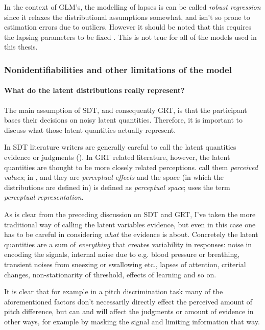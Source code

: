 \documentclass{article}\usepackage{knitr}
\begin{document}
In the context of GLM's, the modelling of lapses is can be called \textit{robust regression} \citep[p. 635]{kruschke2015} since it relaxes the distributional assumptions somewhat, and isn't so prone to estimation errors due to outliers. However it should be noted that this requires the lapsing parameters to be fixed \cite{skrondahl2004}. This is not true for all of the models used in this thesis.

\subsubsection{Nonidentifiabilities and other limitations of the model}

\paragraph{What do the latent distributions really represent?}

The main assumption of SDT, and consequently GRT, is that the participant bases their decisions on noisy latent quantities. Therefore, it is important to discuss what those latent quantities actually represent.  

In SDT literature writers are generally careful to call the latent quantities evidence \citep{wickens2002, verde2006} or judgments (\citealp[p. 247]{stigler2003}). In GRT related literature, however, the latent quantities are thought to be more closely related perceptions. \cite{ashby2015} call them \textit{perceived values}; in \cite{ashby1986},  \cite{kadlec1992} and \cite{silbert2009} they are \textit{perceptual effects} and the space (in which the distributions are defined in) is defined as \textit{perceptual space}; \cite{soto2017} uses the term \textit{perceptual representation}.

As is clear from the preceding discussion on SDT and GRT, I've taken the more traditional way of calling the latent variables evidence, but even in this case one has to be careful in considering \textit{what} the evidence is about. Concretely the latent quantities are a sum of \textit{everything} that creates variability in responses: noise in encoding the signals, internal noise due to e.g. blood pressure or breathing, transient noises from sneezing or swallowing etc., lapses of attention, criterial changes, non-stationarity of threshold, effects of learning and so on. 

It is clear that for example in a pitch discrimination task many of the aforementioned factors don't necessarily directly effect the perceived amount of pitch difference, but can and will affect the judgments or amount of evidence in other ways, for example by masking the signal and limiting information that way.
\end{document}

